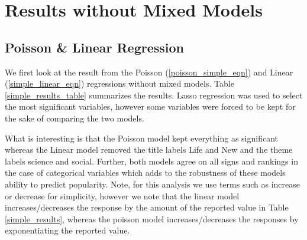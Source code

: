 \section{Results without Mixed Models}
\subsection{Poisson \& Linear Regression}
We first look at the result from the Poisson (\ref{poisson_simple_eqn}) and Linear (\ref{simple_linear_eqn}) regressions without mixed models. Table \ref{simple_results_table} summarizes the results. Lasso regression was used to select the most significant variables, however some variables were forced to be kept for the sake of comparing the two models.

What is interesting is that the Poisson model kept everything as significant whereas the Linear model removed the title labels Life and New and the theme labels science and social. Further, both models agree on all signs and rankings in the case of categorical variables which adds to the robustness of these models ability to predict popularity. Note, for this analysis we use terms such as increase or decrease for simplicity, however we note that the linear model increases/decreases the response by the amount of the reported value in Table \ref{simple_results}, whereas the poisson model increases/decreases the responses by exponentiating the reported value.
